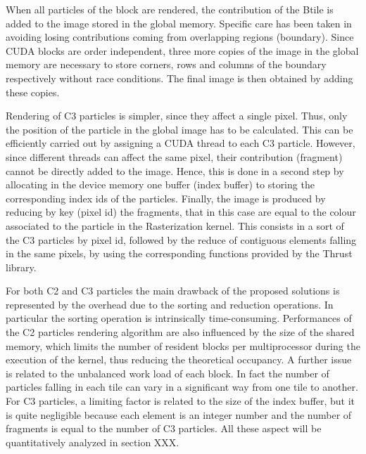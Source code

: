 \documentclass[11pt]{article}
\begin{document}
When all particles of the block are rendered, the contribution of the Btile 
is added to the image stored in the global memory. 
Specific care has been taken in avoiding losing contributions coming 
from overlapping regions (boundary). Since CUDA blocks are order independent, three more copies of the image in the global memory are necessary to store corners, rows and columns of the boundary respectively without race conditions. The final image is then obtained by adding these copies.

Rendering of C3 particles is simpler, since they affect a single pixel. 
Thus, only the position of the particle in the global image has to be calculated.
This can be efficiently carried out by assigning a CUDA thread to each C3 particle. 
However, since different threads can affect the same pixel, their contribution (fragment) cannot be directly added to the image. Hence, this is done in a second step by allocating in the device memory one buffer (index buffer) to storing the corresponding index ids of the particles. Finally, the image is produced by reducing by key (pixel id) the fragments, that in this case are equal to the colour associated to the particle in the Rasterization kernel. This consists in a sort of the C3 particles by pixel id, followed by the reduce of 
contiguous elements falling in the same pixels, by using the corresponding 
functions provided by the Thrust library.

For both C2 and C3 particles the main drawback of the proposed solutions 
is represented by the overhead due to the sorting and reduction operations. In particular the sorting operation is intrinsically time-consuming.
Performances of the C2 particles rendering algorithm are also influenced 
by the size of the shared memory, which limits the number of resident blocks
per multiprocessor during the execution of the kernel, thus reducing the theoretical
occupancy. A further issue is related to the
unbalanced work load of each block. In fact the number of particles falling
in each tile can vary in a significant way from one tile to another. 
For C3 particles, a limiting factor is related to the size of the index buffer, but it is quite negligible because each element is an integer number and the number of fragments is equal to the number of C3 particles.
All these aspect will be quantitatively analyzed in section XXX.
\end{document}
